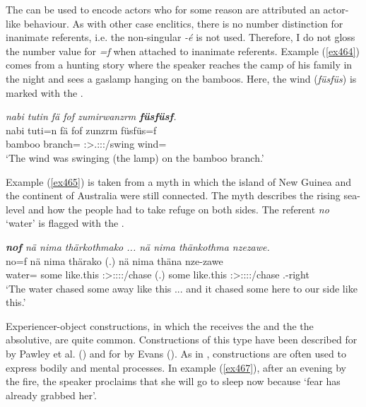 The   can be used to encode  actors who for some reason are attributed an actor-like behaviour. As with other case enclitics, there is no number distinction for inanimate referents, i.e. the non-singular \emph{-é} is not used. Therefore, I do not gloss the number value for \emph{=f} when attached to inanimate referents. Example (\ref{ex464}) comes from a hunting story where the speaker reaches the camp of his family in the night and sees a gaslamp hanging on the bamboos. Here, the wind (\emph{füsfüs}) is marked with the .

\begin{exe}
	\ex \emph{nabi tutin fä fof zumirwanzrm \textbf{füsfüsf}.}\\
	\gll nabi tuti=n fä fof zunzrm füsfüs=f\\
	bamboo branch={\Loc} {\Dist} {\Emph} \Stsg:\Sbj>\Tsg.\F:\Obj:\Pst:\Dur/swing wind={\Erg}\\
	\trans `The wind was swinging (the lamp) on the bamboo branch.'
	\label{ex464}
\end{exe}

Example (\ref{ex465}) is taken from a myth in which the island of New Guinea and the continent of Australia were still connected. The myth describes the rising sea-level and how the people had to take refuge on both sides. The  referent \emph{no} `water' is flagged with the  .

\begin{exe}
	\ex \emph{\textbf{nof} nä nima thärkothmako ... nä nima thänkothma nzezawe.}\\
	\gll no=f nä nima thärako (.) nä nima thäna nze-zawe\\
	water={\Erg} some {like.this} \Sg:\Sbj>\Stpl:\Obj:\Pst:\Pfv:\Andat/chase (.) some {like.this} \Stsg:\Sbj>\Stpl:\Obj:\Pst:\Pfv:\Venit/chase \Fnsg.\Poss-right\\
	\trans `The water chased some away like this ... and it chased some here to our side like this.'
	\label{ex465}
\end{exe}

Experiencer-object constructions, in which the  receives the  and the  the absolutive, are quite common. Constructions of this type have been described for  by Pawley et al. (\citeyear{Pawley:2000vp}) and for  by Evans (\citeyear{Evans:2015wy}). As in ,  constructions are often used to express bodily and mental processes. In example (\ref{ex467}), after an evening by the fire, the speaker proclaims that she will go to sleep now because `fear has already grabbed her'. 


